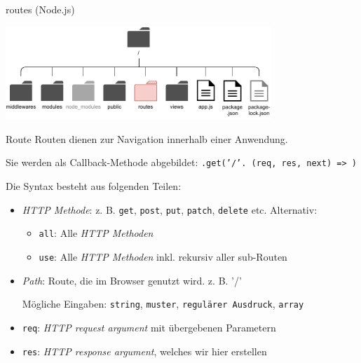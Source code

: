 \begin{bonus}{routes (Node.js)}
    \begin{center}
        \includegraphics[width=0.75\textwidth]{includes/figures/bonus_nodejs_routes.pdf}
    \end{center}
\end{bonus}

\begin{defi}{Route}
    Routen dienen zur Navigation innerhalb einer Anwendung.

    Sie werden als Callback-Methode abgebildet:
    \texttt{.get('/'. (req, res, next) => {})}

    Die Syntax besteht aus folgenden Teilen:
    \begin{itemize}
        \item \emph{HTTP Methode}: z. B. \texttt{get}, \texttt{post}, \texttt{put}, \texttt{patch}, \texttt{delete} etc.
              Alternativ:
              \begin{itemize}
                  \item \texttt{all}: Alle \emph{HTTP Methoden}
                  \item \texttt{use}: Alle \emph{HTTP Methoden} inkl. rekursiv aller sub-Routen
              \end{itemize}
        \item \emph{Path}: Route, die im Browser genutzt wird. z. B. '/'

              Mögliche Eingaben: \texttt{string}, \texttt{muster}, \texttt{regulärer Ausdruck}, \texttt{array}
        \item \texttt{req}: \emph{HTTP request argument} mit übergebenen Parametern
        \item \texttt{res}: \emph{HTTP response argument}, welches wir hier erstellen


\end{itemize}
\end{defi}
